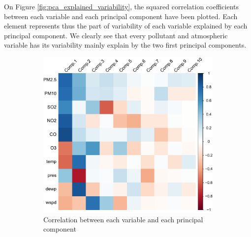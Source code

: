 \documentclass[a4paper, 12pt]{article}
\begin{document}
    On Figure \ref{fig:pca_explained_variability}, the squared correlation coefficients between each variable and each principal component have been plotted. Each element represents thus the part of variability of each variable explained by each principal component. We clearly see that every pollutant and atmospheric variable has its variability mainly explain by the two first principal components.
    
    \begin{figure}[h]
        \centering
        \begin{subfigure}{0.48\textwidth}
            \includegraphics[width = \textwidth]{resources/pdf/pca_variables_correlation.pdf}
            \caption{Correlation between each variable and each principal component}
            \label{fig:pca_variables_correlation}
        \end{subfigure}
        \hspace{0.5em}
        \begin{subfigure}{0.48\textwidth}

\end{subfigure}
\end{figure}
\end{document}
